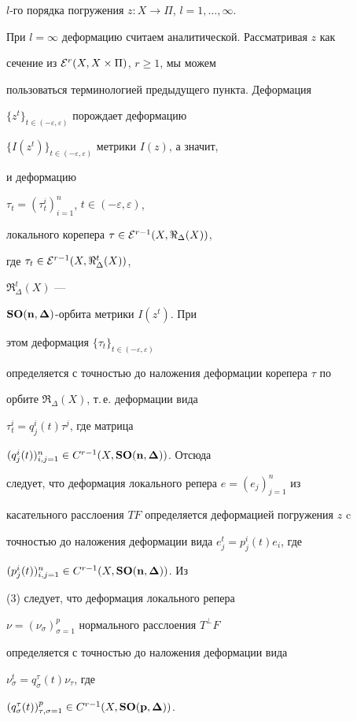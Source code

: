 $l$-го порядка погружения $z: X\to \Pi$, $l= 1,\dotsc,\infty$.


При $l= \infty$ деформацию считаем аналитической. Рассматривая $z$ как


сечение из ${\cal E}^r(X,X\times \Pi)$, $r\ge 1$, мы можем


пользоваться терминологией предыдущего пункта. Деформация


$\{z^t\}_{t\in(-\varepsilon,\varepsilon)}$ порождает деформацию


$\{I(z^t)\}_{t\in(-\varepsilon,\varepsilon)}$ метрики $I(z)$, а значит,


и деформацию


$\tau_t= (\tau^i_t)_{i=1}^n$, $t\in (-\varepsilon,\varepsilon)$,


локального корепера $\tau\in {\cal E}^{r-1}(X,\Re_{\Delta}(X))$,


где $\tau_t\in {\cal E}^{r-1}(X,\Re_{\Delta}^t(X))$,


$\Re_{\Delta}^t(X)$ ---


$\bold{SO(n,\boldsymbol\Delta)}$-орбита метрики $I(z^t)$. При


этом деформация $\{\tau_t\}_{t\in (-\varepsilon,\varepsilon)}$


определяется с точностью до наложения деформации корепера $\tau$ по


орбите $\Re_{\Delta}(X)$, т.\,е. деформации вида


$\tau_t^i= q^i_j(t)\tau^j$, где матрица


$(q^i_j(t))_{i,j=1}^n\in C^{r-1}(X,{\bold{SO(n,\boldsymbol\Delta)}})$. Отсюда


следует, что деформация локального репера $e= (e_j)_{j=1}^n$ из


касательного расслоения $TF$ определяется деформацией погружения $z$ c


точностью до наложения деформации вида $e^t_j= p^i_j(t)e_i$, где


$(p^i_j(t))_{i,j=1}^n\in C^{r-1}(X,{\bold{SO(n,\boldsymbol\Delta)}})$. Из


(3) следует, что деформация локального репера


$\nu= (\nu_{\sigma})_{\sigma=1}^p$ нормального расслоения $T^{\bot}F$


определяется с точностью до наложения деформации вида


$\nu^t_{\sigma}= q^{\tau}_{\sigma}(t)\nu_{\tau}$, где


$(q^{\tau}_{\sigma}(t))_{\tau,\sigma=1}^p\in C^{r-1}(X,{\bold{


SO(p,\bsy\Delta)}})$.





